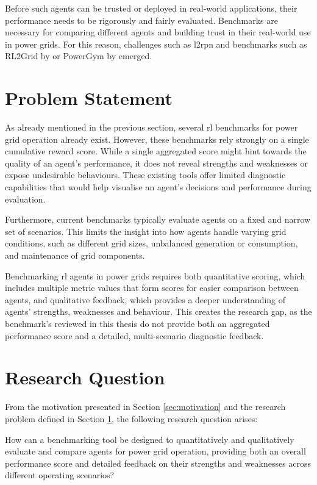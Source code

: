 Before such agents can be trusted or deployed in real-world applications, their performance needs to be rigorously and fairly evaluated. Benchmarks are necessary for comparing different agents and building trust in their real-world use in power grids. For this reason, challenges such as \ac{l2rpn} and benchmarks such as RL2Grid by \citet{rl2grid} or PowerGym by \citet{fan2022powergym} emerged. 

\section{Problem Statement}\label{sec:problem-statement}
As already mentioned in the previous section, several \ac{rl} benchmarks for power grid operation already exist. However, these benchmarks rely strongly on a single cumulative reward score. While a single aggregated score might hint towards the quality of an agent's performance, it does not reveal strengths and weaknesses or expose undesirable behaviours. These existing tools offer limited diagnostic capabilities that would help visualise an agent's decisions and performance during evaluation. 

Furthermore, current benchmarks typically evaluate agents on a fixed and narrow set of scenarios. This limits the insight into how agents handle varying grid conditions, such as different grid sizes, unbalanced generation or consumption, and maintenance of grid components.

Benchmarking \ac{rl} agents in power grids requires both quantitative scoring, which includes multiple metric values that form scores for easier comparison between agents, and qualitative feedback, which provides a deeper understanding of agents' strengths, weaknesses and behaviour. This creates the research gap, as the benchmark's reviewed in this thesis do not provide both an aggregated performance score and a detailed, multi-scenario diagnostic feedback.

\section{Research Question}\label{sec:research-question}
From the motivation presented in Section \ref{sec:motivation} and the research problem defined in Section \ref{sec:problem-statement}, the following research question arises:

\begin{displayquote}
How can a benchmarking tool be designed to quantitatively and qualitatively evaluate and compare agents for power grid operation, providing both an overall performance score and detailed feedback on their strengths and weaknesses across different operating scenarios?
\end{displayquote}



